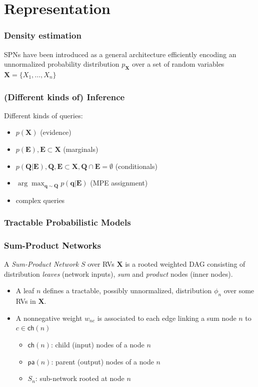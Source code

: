 \documentclass[10pt, t, xcolor={usenames,dvipsnames,svgnames}, compress]{beamer}
\begin{document}
\section{Representation}
{
  \begin{frame}[c]
    \sectionpage
  \end{frame}
}

\begin{frame}
  \frametitle{Density estimation}

SPNs have been introduced as a general architecture efficiently encoding an
unnormalized probability distribution $p_{\mathbf X}$ over a set of random 
variables $\mathbf X = \{X_1 , \ldots, X_n \}$

\end{frame}

\begin{frame}
  \frametitle{(Different kinds of) Inference}
  Different kinds of queries:
  \begin{itemize}
  \item $p(\mathbf{X})$ (evidence)
  \item $p(\mathbf{E}), \mathbf{E}\subset\mathbf{X}$ (marginals)
  \item $p(\mathbf{Q}|\mathbf{E}), \mathbf{Q},
    \mathbf{E}\subset\mathbf{X}, \mathbf{Q}\cap \mathbf{E}=\emptyset$ (conditionals)
  \item
    $\arg\max_{\mathbf{q}\sim\mathbf{Q}}p(\mathbf{q}|\mathbf{E})$
    (MPE assignment)
    \item complex queries
  \end{itemize}
\end{frame}

\begin{frame}
  \frametitle{Tractable Probabilistic Models}
\end{frame}

\begin{frame}
  \frametitle{Sum-Product Networks}
  A \emph{Sum-Product Network} $S$ over RVs $\mathbf X$ is a
  rooted weighted DAG consisting of
  distribution \emph{leaves} (network inputs),  \emph{sum} and \emph{product}
  nodes (inner nodes).

\vspace{0.5 cm}
\begin{minipage}{0.65\textwidth}
\begin{itemize}
\item  A leaf $n$ defines a tractable, possibly unnormalized, distribution
  $\phi_{n}$ over some RVs in $\mathbf X$.
\item  A nonnegative weight $w_{nc}$ is associated to each edge linking a sum node
  $n$ to $c\in\mathsf{ch}(n)$
\begin{itemize}
\item $\mathsf{ch}(n)$:  child (input) nodes of   a node $n$ 
\item $\mathsf{pa}(n)$:  parent (output) nodes of a node $n$
\item $S_{n}$: sub-network rooted at node $n$ 
\end{itemize}
\end{itemize}
\end{minipage}
\end{frame}
\end{document}
